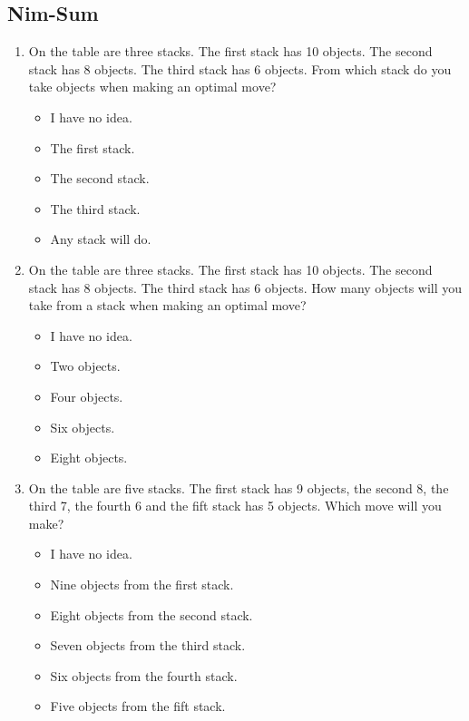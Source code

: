\subsection{Nim-Sum}
\begin{framed}
\begin{enumerate}
	\item On the table are three stacks. The first stack has 10 objects. The
		second stack has 8 objects. The third stack has 6 objects. From which
		stack do you take objects when making an optimal move?
		\begin{itemize}
			\item I have no idea.
			\item The first stack.
			\item The second stack.
			\item The third stack.
			\item Any stack will do.
		\end{itemize}
	\item On the table are three stacks. The first stack has 10 objects. The
		second stack has 8 objects. The third stack has 6 objects. How many
		objects will you take from a stack when making an optimal move?
		\begin{itemize}
			\item I have no idea.
			\item Two objects.
			\item Four objects.
			\item Six objects.
			\item Eight objects.
		\end{itemize}
	\item On the table are five stacks. The first stack has 9 objects, the
		second 8, the third 7, the fourth 6 and the fift stack has 5 objects.
		Which move will you make?
		\begin{itemize}
			\item I have no idea.
			\item Nine objects from the first stack.
			\item Eight objects from the second stack.
			\item Seven objects from the third stack.
			\item Six objects from the fourth stack.
			\item Five objects from the fift stack.
		\end{itemize}
\end{enumerate}
\end{framed}
